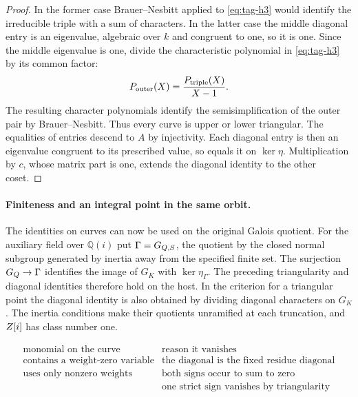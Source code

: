 \begin{proof}
In
the former case Brauer--Nesbitt applied to \eqref{eq:tag-h3} would identify
the irreducible triple with a sum of characters. In the
latter case the middle diagonal entry is an eigenvalue,
algebraic over \(k\) and congruent to one, so it is one.
Since the middle eigenvalue is one, divide the characteristic polynomial in \eqref{eq:tag-h3} by its common factor:
\[
 P_{\rm outer}(X)=\frac{P_{\rm triple}(X)}{X-1}.
\]
The resulting character polynomials identify the semisimplification of the outer pair by Brauer--Nesbitt. Thus every curve is upper or lower triangular.
The equalities of entries descend to \(A\) by injectivity.
Each diagonal entry is then an eigenvalue congruent to its
prescribed value, so equals it on \(\ker\eta\). Multiplication
by \(c\), whose matrix part is one, extends the diagonal
identity to the other coset.

\end{proof}

\paragraph{Finiteness and an integral point in the same orbit.}
The identities on curves can now be used on the original Galois quotient. For the
auxiliary field over \(\mathbb Q(i)\) put \(\Gamma=G_{Q,S}\), the quotient
by the closed normal subgroup generated by inertia away
from the specified finite set. The surjection
\(G_Q\to\Gamma\) identifies the image of \(G_K\) with
\(\ker\eta_\Gamma\). The preceding triangularity and diagonal
identities therefore hold on the host. In the criterion for a triangular point the diagonal identity is also
obtained by dividing diagonal characters on \(G_K\).
The inertia conditions make their quotients unramified at
each truncation, and \(Z[i]\) has class number one.

\begin{construction}
\[
\begin{array}{ll}
\text{monomial on the curve}&\text{reason it vanishes}\\ \hline
\text{contains a weight-zero variable}&\text{the diagonal is the fixed residue diagonal}\\
\text{uses only nonzero weights}&\text{both signs occur to sum to zero}\\
 &\text{one strict sign vanishes by triangularity}
\end{array}
\]
\caption{The closed-fibre test for a nonconstant monomial of weight zero at the Gaussian host. Triangularity is available on each marked residual curve.}\label{fig:marked-host-zero-invariants}
\end{construction}

